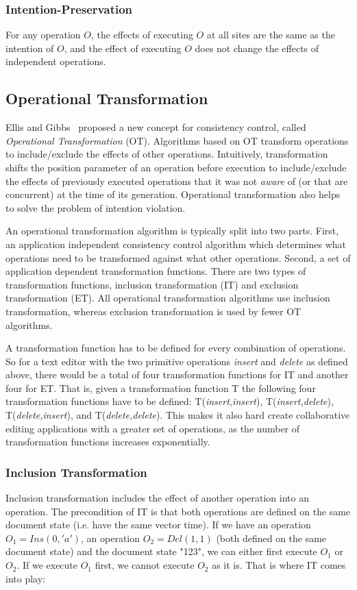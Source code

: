\subsubsection{Intention-Preservation} 
For any operation $O$, the effects of
executing $O$ at all sites are the same as the intention of $O$, and the effect
of executing $O$ does not change the effects of independent operations.


\subsection{Operational Transformation}
{Ellis and Gibbs}~\cite{ellis} proposed a new concept for
consistency control, called \emph{Operational Transformation} (OT). 
Algorithms based on OT transform operations to include/exclude the effects of other operations. 
Intuitively, transformation shifts the position parameter of an
operation before execution to include/exclude the effects of previously executed
operations that it was not \emph{aware} of (or that are concurrent) at the
time of its generation. Operational transformation also helps to solve the
problem of intention violation.

An operational transformation algorithm is typically split into two parts. 
First, an application independent consistency control algorithm which determines 
what operations need to be transformed against what other operations. Second,
a set of application dependent transformation functions. There are two
types of transformation functions, inclusion transformation (IT) and 
exclusion transformation (ET). All operational transformation algorithms
use inclusion transformation, whereas exclusion transformation is used
by fewer OT algorithms.

A transformation function has to be defined for every combination of operations.
So for a text editor with the two primitive operations \emph{insert} and
\emph{delete} as defined above, there would be a total of four transformation
functions for IT and another four for ET. That is, given a transformation
function T the following four transformation functions have to be defined:
T(\emph{insert,insert}), T(\emph{insert,delete}), T(\emph{delete,insert}), 
and T(\emph{delete,delete}). This makes it also hard create collaborative
editing applications with a greater set of operations, as the number of
transformation functions increases exponentially.


\subsubsection{Inclusion Transformation}
Inclusion transformation includes the effect of another operation into an
operation. The precondition of IT is that both operations are defined on the
same document state (i.e. have the same vector time). If we have an operation
$O_1 = Ins(0,'a')$, an operation $O_2 = Del(1,1)$ (both defined on the same
document state) and the document state "123", we can either first
execute $O_1$ or $O_2$. If we execute $O_1$ first, we cannot execute $O_2$
as it is. That is where IT comes into play:

